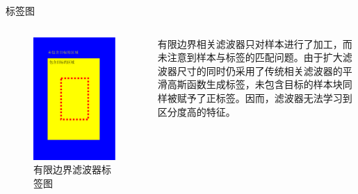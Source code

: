 \begin{frame}{标签图}
\begin{columns}
\centering
{}
\begin{figure}[htp]
  \includegraphics[height=.7\textheight]{figures/CFwLBlabels.pdf}
\caption{有限边界滤波器标签图}
\label{fig:CFwLB_labels}
\end{figure}

\setlength{\parindent}{2\ccwd}

有限边界相关滤波器只对样本进行了加工，而未注意到样本与标签的匹配问题。由于扩大滤波器尺寸的同时仍采用了传统相关滤波器的平滑高斯函数生成标签，未包含目标的样本块同样被赋予了正标签。因而，滤波器无法学习到区分度高的特征。
\end{columns}
\end{frame}


